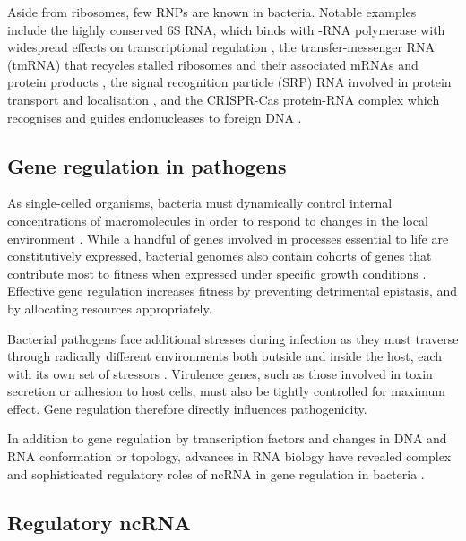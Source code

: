 Aside from ribosomes, few RNPs are known in bacteria. Notable examples include the highly conserved 6S RNA, which binds with -RNA polymerase with widespread effects on transcriptional regulation \citep{Wassarman2007-de}, the transfer-messenger RNA (tmRNA) that recycles stalled ribosomes and their associated mRNAs and protein products \citep{Moore_Sauer_2007}, the signal recognition particle (SRP) RNA involved in protein transport and localisation \citep{Akopian_Shen_Zhang_Shan_2013}, and the CRISPR-Cas protein-RNA complex which recognises and guides endonucleases to foreign DNA \citep{Barrangou2015-sf}.\par

\subsection{Gene regulation in pathogens}

As single-celled organisms, bacteria must dynamically control internal concentrations of macromolecules in order to respond to changes in the local environment \citep{Dorman2018-dv}. While a handful of genes involved in processes essential to life are constitutively expressed, bacterial genomes also contain cohorts of genes that contribute most to fitness when expressed under specific growth conditions \citep{Price2016-gi}. Effective gene regulation increases fitness by preventing detrimental epistasis, and by allocating resources appropriately. \par

Bacterial pathogens face additional stresses during infection as they must traverse through radically different environments both outside and inside the host, each with its own set of stressors \citep{Cotter2000-it}. Virulence genes, such as those involved in toxin secretion or adhesion to host cells, must also be tightly controlled for maximum effect. Gene regulation therefore directly influences pathogenicity. \par 
In addition to gene regulation by transcription factors and changes in DNA and RNA conformation or topology, advances in RNA biology have revealed complex and sophisticated regulatory roles of ncRNA in gene regulation in bacteria \citep{Hor2018-ns}.

\subsection{Regulatory ncRNA}

